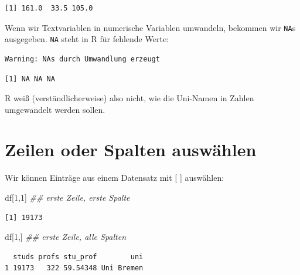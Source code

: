 \documentclass[
  letterpaper,
  DIV=11,
  numbers=noendperiod]{scrreprt}
\newenvironment{Shaded}{\begin{snugshade}}{\end{snugshade}}
\newcommand{\DecValTok}[1]{\textcolor[rgb]{0.68,0.00,0.00}{#1}}
\newcommand{\DocumentationTok}[1]{\textcolor[rgb]{0.37,0.37,0.37}{\textit{#1}}}
\newcommand{\FunctionTok}[1]{\textcolor[rgb]{0.28,0.35,0.67}{#1}}
\newcommand{\NormalTok}[1]{\textcolor[rgb]{0.00,0.46,0.62}{#1}}
\newcommand{\SpecialCharTok}[1]{\textcolor[rgb]{0.37,0.37,0.37}{#1}}
\begin{document}
\begin{verbatim}
[1] 161.0  33.5 105.0
\end{verbatim}

Wenn wir Textvariablen in numerische Variablen umwandeln, bekommen wir
\texttt{NA}s ausgegeben. \texttt{NA} steht in R für fehlende Werte:

\begin{Shaded}
\end{Shaded}

\begin{verbatim}
Warning: NAs durch Umwandlung erzeugt
\end{verbatim}

\begin{verbatim}
[1] NA NA NA
\end{verbatim}

R weiß (verständlicherweise) also nicht, wie die Uni-Namen in Zahlen
umgewandelt werden sollen.

\hypertarget{zeilen-oder-spalten-auswuxe4hlen}{%
\section{Zeilen oder Spalten
auswählen}\label{zeilen-oder-spalten-auswuxe4hlen}}

Wir können Einträge aus einem Datensatz mit {[} {]} auswählen:

\begin{Shaded}
\begin{Highlighting}[]
\NormalTok{df[}\DecValTok{1}\NormalTok{,}\DecValTok{1}\NormalTok{] }\DocumentationTok{\#\# erste Zeile, erste Spalte}
\end{Highlighting}
\end{Shaded}

\begin{verbatim}
[1] 19173
\end{verbatim}

\begin{Shaded}
\begin{Highlighting}[]
\NormalTok{df[}\DecValTok{1}\NormalTok{,]  }\DocumentationTok{\#\# erste Zeile, alle Spalten}
\end{Highlighting}
\end{Shaded}

\begin{verbatim}
  studs profs stu_prof        uni
1 19173   322 59.54348 Uni Bremen
\end{verbatim}
\end{document}
